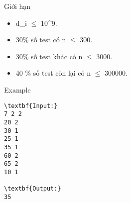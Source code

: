 Giới hạn
\begin{itemize}
	\item d\_i  $\le$  10^9.
	\item 30\% số test có n  $\le$  300.
	\item 30\% số test khác có n  $\le$  3000.
	\item 40 \% số test còn lại có n  $\le$  300000.
\end{itemize}
Example
\begin{verbatim}
\textbf{Input:}
7 2 2
20 2
30 1
25 1
35 1
60 2
65 2
10 1

\textbf{Output:}
35\end{verbatim}
